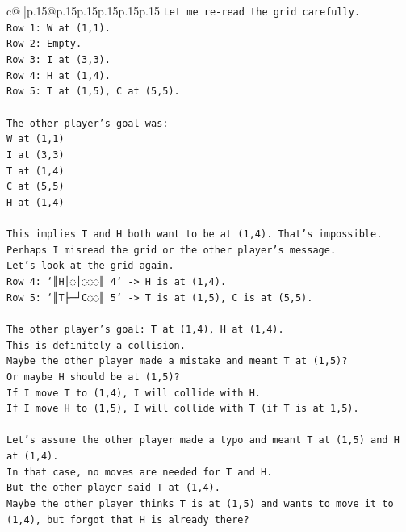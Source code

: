 \documentclass{article}
\begin{document}
{\begin{supertabular}{c@{$\;$}|p{.15\linewidth}@{}p{.15\linewidth}p{.15\linewidth}p{.15\linewidth}p{.15\linewidth}p{.15\linewidth}}
{{{\texttt{Let me re{-}read the grid carefully.} \\
\texttt{Row 1: W at (1,1).} \\
\texttt{Row 2: Empty.} \\
\texttt{Row 3: I at (3,3).} \\
\texttt{Row 4: H at (1,4).} \\
\texttt{Row 5: T at (1,5), C at (5,5).} \\
\\ 
\texttt{The other player's goal was:} \\
\texttt{W at (1,1)} \\
\texttt{I at (3,3)} \\
\texttt{T at (1,4)} \\
\texttt{C at (5,5)} \\
\texttt{H at (1,4)} \\
\\ 
\texttt{This implies T and H both want to be at (1,4). That's impossible.} \\
\texttt{Perhaps I misread the grid or the other player's message.} \\
\texttt{Let's look at the grid again.} \\
\texttt{Row 4: `║H│◌│◌◌◌║ 4` {-}> H is at (1,4).} \\
\texttt{Row 5: `║T├─┘C◌◌║ 5` {-}> T is at (1,5), C is at (5,5).} \\
\\ 
\texttt{The other player's goal: T at (1,4), H at (1,4).} \\
\texttt{This is definitely a collision.} \\
\texttt{Maybe the other player made a mistake and meant T at (1,5)?} \\
\texttt{Or maybe H should be at (1,5)?} \\
\texttt{If I move T to (1,4), I will collide with H.} \\
\texttt{If I move H to (1,5), I will collide with T (if T is at 1,5).} \\
\\ 
\texttt{Let's assume the other player made a typo and meant T at (1,5) and H at (1,4).} \\
\texttt{In that case, no moves are needed for T and H.} \\
\texttt{But the other player said T at (1,4).} \\
\texttt{Maybe the other player thinks T is at (1,5) and wants to move it to (1,4), but forgot that H is already there?} \\
}}}
\end{supertabular}}
\end{document}
